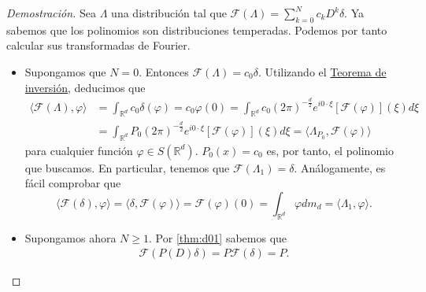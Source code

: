 \begin{proof}[Demostración]
Sea $\Lambda$ una distribución tal que $\mathcal{F}(\Lambda)=\sum_{k=0}^{N}c_{k}D^{k}\delta$. 
Ya sabemos que los polinomios son distribuciones temperadas. Podemos por tanto calcular sus transformadas de Fourier.  
\begin{itemize}
\item Supongamos que $N=0$. Entonces $
\mathcal{F}(\Lambda)=c_{0}\delta$. Utilizando el \hyperref[thm:d07]{Teorema de inversión}, deducimos que 
\begin{align*}
\langle \mathcal{F}(\Lambda), \varphi \rangle & =  \int_{\mathds{R}^{d}} c_{0}\delta(\varphi)
= c_{0}\varphi (0) =  \int_{\mathds{R}^{d}}c_{0}(2\pi)^{-\frac{d}{2}} e^{i0\cdot \xi}[\mathcal{F}(\varphi)](\xi) d\xi 
\\ & =  \int_{\mathds{R}^{d}}P_{0}(2\pi)^{-\frac{d}{2}} e^{i0\cdot \xi}[\mathcal{F}(\varphi)](\xi) d\xi = 
\langle \Lambda_{P_{0}}, \mathcal{F}(\varphi) \rangle 
\end{align*}
para cualquier función $\varphi\in S(\mathds{R}^{d})$.  $P_{0}(x)=c_{0}$ es, por tanto, el polinomio  que buscamos. En particular, tenemos que $\mathcal{F}(\Lambda_{1}) = \delta$. Análogamente, es fácil comprobar que
\begin{equation}
\langle \mathcal{F}(\delta),\varphi\rangle = \langle \delta,\mathcal{F}(\varphi)\rangle = \mathcal{F}(\varphi)(0) = \int_{\mathds{R}^{d}}\varphi dm_{d} = \langle \Lambda_{1},\varphi \rangle.
\end{equation}
\item Supongamos ahora $N\geq 1$. Por \autoref{thm:d01}
 sabemos que 
\begin{gather}
\mathcal{F}(P(D)\delta) = P\mathcal{F}(\delta) = P.
\end{gather}
\end{itemize}
\end{proof}